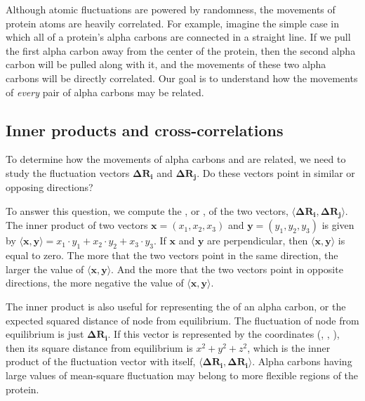 Although atomic fluctuations are powered by randomness, the movements of protein atoms are heavily correlated. For example, imagine the simple case in which all of a protein's alpha carbons are connected in a straight line. If we pull the first alpha carbon away from the center of the protein, then the second alpha carbon will be pulled along with it, and the movements of these two alpha carbons will be directly correlated. Our goal is to understand how the movements of \textit{every} pair of alpha carbons may be related.

\FloatBarrier
{}
\subsection{Inner products and cross-correlations}

To determine how the movements of alpha carbons  and  are related, we need to study the fluctuation vectors $ \mathbf{\Delta R_i} $ and $\mathbf{\Delta R_j}$. Do these vectors point in similar or opposing directions?

To answer this question, we compute the , or , of the two vectors, $ \langle \mathbf{\Delta R_i}, \mathbf{\Delta R_j} \rangle $. The inner product of two vectors $\mathbf{x} = (x_1, x_2, x_3)$ and $\mathbf{y} = (y_1, y_2, y_3)$ is given by $ \langle \mathbf{x}, \mathbf{y} \rangle = x_1 \cdot y_1 + x_2 \cdot y_2 + x_3 \cdot y_3$. If $\mathbf{x}$ and $\mathbf{y}$ are perpendicular, then $ \langle \mathbf{x}, \mathbf{y} \rangle $ is equal to zero. The more that the two vectors point in the same direction, the larger the value of $\langle \mathbf{x}, \mathbf{y} \rangle $. And the more that the two vectors point in opposite directions, the more negative the value of $\langle \mathbf{x}, \mathbf{y} \rangle $.\\

\begin{qbox}[%
	Say that $\mathbf{x} = (1, -2, 3)$, $\mathbf{y} = (2, -3, 5)$, and  $\mathbf{z} = (-1, 3, -4)$. Compute the inner products $\langle \mathbf{x}, \mathbf{y} \rangle$ and $\langle \mathbf{x}, \mathbf{z} \rangle$. Ensure that your answers match the preceding observation about the value of the inner product and the directions of vectors.
	]\end{qbox}

The inner product is also useful for representing  the  of an alpha carbon, or the expected squared distance of node  from equilibrium. The fluctuation of node  from equilibrium is just $\mathbf{\Delta R_i}$. If this vector is represented by the coordinates (, , ), then its square distance from equilibrium is $x^2 + y^2 + z^2$, which is the inner product of the fluctuation vector with itself, $ \langle \mathbf{\Delta R_i}, \mathbf{\Delta R_i} \rangle $. Alpha carbons having large values of mean-square fluctuation may belong to more flexible regions of the protein.\\

